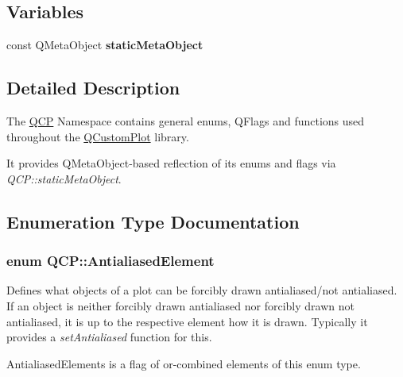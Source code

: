 \subsection*{Variables}
\begin{DoxyCompactItemize}
\item 
const Q\+Meta\+Object {\bfseries static\+Meta\+Object}\hypertarget{namespace_q_c_p_a07ffa1eb1537a3b1f218ff2a442b2017}{}\label{namespace_q_c_p_a07ffa1eb1537a3b1f218ff2a442b2017}

\end{DoxyCompactItemize}


\subsection{Detailed Description}
The \hyperlink{namespace_q_c_p}{Q\+CP} Namespace contains general enums, Q\+Flags and functions used throughout the \hyperlink{class_q_custom_plot}{Q\+Custom\+Plot} library.

It provides Q\+Meta\+Object-\/based reflection of its enums and flags via {\itshape Q\+C\+P\+::static\+Meta\+Object}. 

\subsection{Enumeration Type Documentation}
\subsubsection[{\texorpdfstring{Antialiased\+Element}{AntialiasedElement}}]{\setlength{\rightskip}{0pt plus 5cm}enum {\bf Q\+C\+P\+::\+Antialiased\+Element}}\hypertarget{namespace_q_c_p_ae55dbe315d41fe80f29ba88100843a0c}{}\label{namespace_q_c_p_ae55dbe315d41fe80f29ba88100843a0c}
Defines what objects of a plot can be forcibly drawn antialiased/not antialiased. If an object is neither forcibly drawn antialiased nor forcibly drawn not antialiased, it is up to the respective element how it is drawn. Typically it provides a {\itshape set\+Antialiased} function for this.

{\ttfamily Antialiased\+Elements} is a flag of or-\/combined elements of this enum type.

